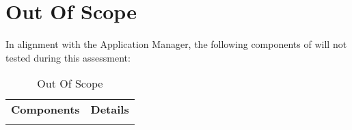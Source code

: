 {\section{Out Of Scope}
\label{section:OutOfScope}

In alignment with the Application Manager, the following components of \textbf{\TargetInfoName} will not tested during this assessment:

\begin{xltabular}{\textwidth}{|l|X|}
	\hline
	 \textbf{Components} &  \textbf{Details}  \\
	\OutOfScope
	\hline
	\caption{Out Of Scope} \label{table:OutOfScope}
\end{xltabular}

}